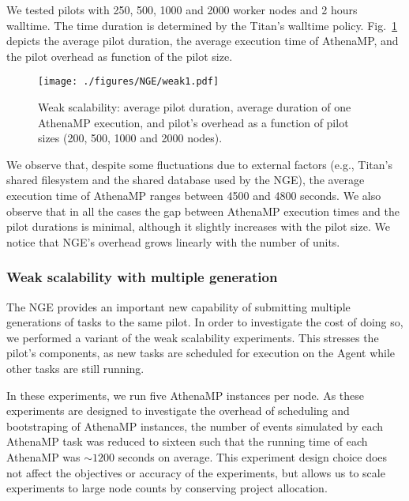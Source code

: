We tested pilots with 250, 500, 1000 and 2000 worker nodes and 2 hours
walltime. The time duration is determined by the Titan's walltime policy.
Fig.~\ref{fig:weakScal1a} depicts the average pilot duration, the average
execution time of AthenaMP, and the pilot overhead as function of the pilot
size.

\begin{figure}[!t]
    \texttt{[image: ./figures/NGE/weak1.pdf]}
   	\vspace{-0.3in}
    \caption{Weak scalability: average pilot duration, average duration of
    one AthenaMP execution, and pilot's overhead as a function of pilot sizes
    (200, 500, 1000 and 2000 nodes).}\label{fig:weakScal1a}
\end{figure}

We observe that, despite some fluctuations due to external factors (e.g.,
Titan's shared filesystem and the shared database used by the NGE), the
average execution time of AthenaMP ranges between 4500 and 4800 seconds. We
also observe that in all the cases the gap between AthenaMP execution times
and the pilot durations is minimal, although it slightly increases with the
pilot size. We notice that NGE's overhead grows linearly with the number
of units.

\subsubsection{Weak scalability with multiple generation}

The NGE provides an important new capability of submitting multiple
generations of tasks to the same pilot. In order to investigate the cost
of doing so, we performed a variant of the weak scalability experiments. This
stresses the pilot's components, as new tasks are scheduled for execution on
the Agent while other tasks are still running.

In these experiments, we run five AthenaMP instances per node. As these
experiments are designed to investigate the overhead of  scheduling and
bootstraping of AthenaMP instances, the number of events simulated by each
AthenaMP task was reduced to sixteen such that the running time of each
AthenaMP was $\sim 1200$ seconds on average. This experiment design choice
does not affect the objectives or accuracy of the experiments, but allows us
to scale experiments to large node counts by conserving project allocation.

